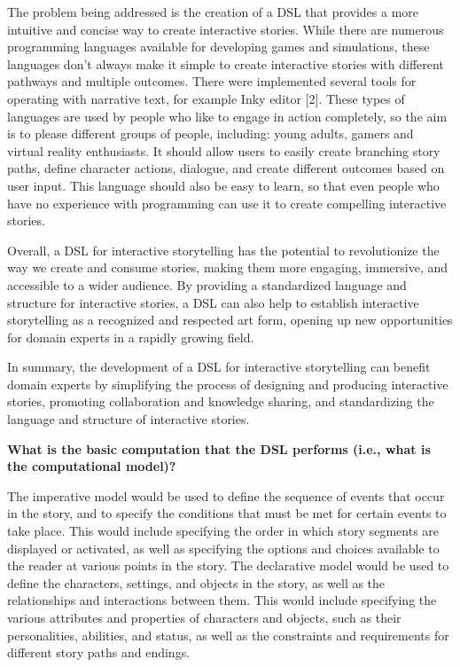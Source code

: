 The problem being addressed is the creation of a DSL that provides a more intuitive and concise way to create interactive stories. While there are numerous programming languages available for developing games and simulations, these languages don’t always make it simple to create interactive stories with different pathways and multiple outcomes. There were implemented several tools for operating with narrative text, for example Inky editor [2].	
These types of languages are used by people who like to engage in action completely, so the aim is to please different groups of people, including: young adults, gamers and virtual reality enthusiasts. It should allow users to easily create branching story paths, define character actions, dialogue, and create different outcomes based on user input. This language should also be easy to learn, so that even people who have no experience with programming can use it to create compelling interactive stories.


Overall, a DSL for interactive storytelling has the potential to revolutionize the way we create and consume stories, making them more engaging, immersive, and accessible to a wider audience. By providing a standardized language and structure for interactive stories, a DSL can also help to establish interactive storytelling as a recognized and respected art form, opening up new opportunities for domain experts in a rapidly growing field.

In summary, the development of a DSL for interactive storytelling can benefit domain experts by simplifying the process of designing and producing interactive stories, promoting collaboration and knowledge sharing, and standardizing the language and structure of interactive stories.

\textbf{What is the basic computation that the DSL performs (i.e., what is the computational model)?}

The imperative model would be used to define the sequence of events that occur in the story, and to specify the conditions that must be met for certain events to take place. This would include specifying the order in which story segments are displayed or activated, as well as specifying the options and choices available to the reader at various points in the story.
The declarative model would be used to define the characters, settings, and objects in the story, as well as the relationships and interactions between them. This would include specifying the various attributes and properties of characters and objects, such as their personalities, abilities, and status, as well as the constraints and requirements for different story paths and endings.


